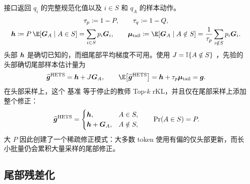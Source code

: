 接口返回 $q_i$  的完整规范化值以及 $i\in S$  和 $q_A$  的样本动作。
\begin{equation}
  \begin{gathered}
  \tau_p\coloneqq1-P,\qquad \tau_q\coloneqq1-Q,\\[-1pt]
  \bhead\coloneqq P\,\E[\btoken_A\mid A\in S] = \sum_{i\in S} p_i\btoken_i,
  \qquad
  \bmean_{\mathrm{tail}}\coloneqq
  \E\!\left[\btoken_A\mid A\notin S\right] = \frac{1}{\tau_p}\sum_{i\notin S} p_i\btoken_i.
  \end{gathered}
  \label{eq:head-tail-definitions}
\end{equation}
头部 $\bm{h}$ 是确切已知的，而细尾部平均梯度不可用。使用 $J=\mathbb{I}\{A\notin S\}$ ，先验的头部确切尾部样本估计量为
\begin{equation}
 \widehat{\bgrad}^{\mathrm{HETS}}
 =\bhead+J\btoken_A,
 \qquad
 \E\!\left[\widehat{\bgrad}^{\mathrm{HETS}}\right]
 =\bhead+\tau_p\bmean_{\mathrm{tail}}=\bgrad.
 \label{eq:g0}
\end{equation}
在头部采样上，这个 \gzero{} 基准 \citep{zhang2026ema} 等于停止的教师 Top-$k$ rKL，并且仅在尾部采样上添加整个修正：
\begin{equation}
 \widehat{\bm{g}}^{\mathrm{HETS}}
 =
 \begin{cases}
  \bm{h}, & A\in S,\\
  \bm{h}+\bm{G}_A, & A\notin S,
 \end{cases}
 \qquad
 \Pr(A\in S)=P.
 \label{eq:g0-rare-correction}
\end{equation}
大 $P$ 因此创建了一个稀疏修正模式：大多数 token 使用有偏的仅头部更新，而长小批量仍会累积大量采样的尾部修正。

\subsection{尾部残差化}
\label{subsec:cfr}

